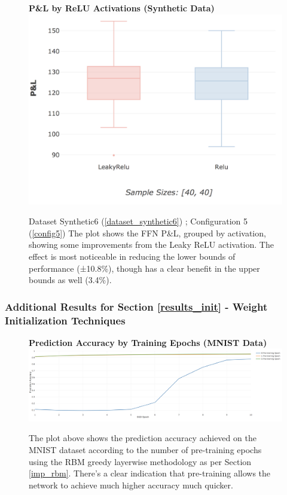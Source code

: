 \documentclass[a4paper,11pt,oneside]{article}
\theoremstyle{plain}
\theoremstyle{definition}
\begin{document}
		\begin{figure}[H]
		\textbf{P\&L by ReLU Activations (Synthetic Data)}
		\centering
		\includegraphics[scale=0.3]{images/results/activations/synthetic_pl_leakyrelu.png}
		\caption[P\&L by ReLU Activations (Synthetic Data)]{Dataset Synthetic6  (\ref{dataset_synthetic6}) ; Configuration 5 (\ref{config5})
			\newline The plot shows the FFN P\&L, grouped by activation, showing some improvements from the Leaky ReLU activation. The effect is most noticeable in reducing the lower bounds of performance (±10.8\%), though has a clear benefit in the upper bounds as well (3.4\%).}
		\label{figure-synthetic_pl_leakyrelu}
	\end{figure}
	
	\subsubsection{Additional Results for Section \ref{results_init} - Weight Initialization Techniques }\label{results_init_appendix}
	
	\begin{figure}[H]
		\centering 
		\textbf{Prediction Accuracy by Training Epochs (MNIST Data)} 
		\includegraphics[scale=0.2]{images/results/newinit/rbm_pretraining.png}
		\caption[Prediction Accuracy by Training Epochs (MNIST Data)]{The plot above shows the prediction accuracy achieved on the MNIST dataset according to the number of pre-training epochs using the RBM greedy layerwise methodology as per Section \ref{imp_rbm}. There's a clear indication that pre-training allows the network to achieve much higher accuracy much quicker.}
		\label{figure-rbm_pretraining}
	\end{figure}
	
\end{document}
